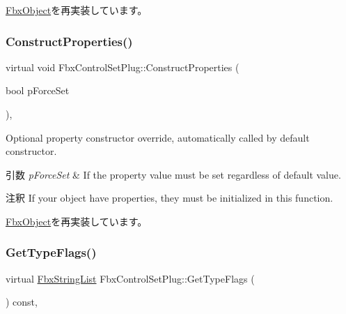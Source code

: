 \hyperlink{class_fbx_object_a313503bc645af3fdceb4a99ef5cea7eb}{Fbx\+Object}を再実装しています。

\mbox{\label{class_fbx_control_set_plug_a9551bc59f788d2b0e44b7b8ba31188a6}} 
\subsubsection{\texorpdfstring{Construct\+Properties()}{ConstructProperties()}}
{\footnotesize\ttfamily virtual void Fbx\+Control\+Set\+Plug\+::\+Construct\+Properties (\begin{DoxyParamCaption}\item[{bool}]{p\+Force\+Set }\end{DoxyParamCaption})\hspace{0.3cm}{\ttfamily [protected]}, {\ttfamily [virtual]}}

Optional property constructor override, automatically called by default constructor. 
\begin{DoxyParams}{引数}
{\em p\+Force\+Set} & If the property value must be set regardless of default value. \\
\hline
\end{DoxyParams}
\begin{DoxyRemark}{注釈}
If your object have properties, they must be initialized in this function. 
\end{DoxyRemark}


\hyperlink{class_fbx_object_ad44f814323dc1b5e78bff1bfc608b4bb}{Fbx\+Object}を再実装しています。

\mbox{\label{class_fbx_control_set_plug_a3111172be32f425f4d9b3bf281d2b4d2}} 
\subsubsection{\texorpdfstring{Get\+Type\+Flags()}{GetTypeFlags()}}
{\footnotesize\ttfamily virtual \hyperlink{class_fbx_string_list}{Fbx\+String\+List} Fbx\+Control\+Set\+Plug\+::\+Get\+Type\+Flags (\begin{DoxyParamCaption}{ }\end{DoxyParamCaption}) const\hspace{0.3cm}{\ttfamily [protected]}, {\ttfamily [virtual]}}



